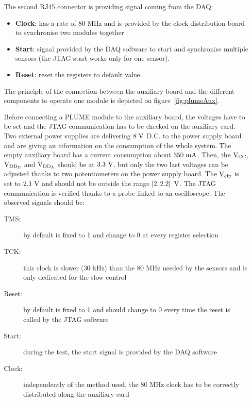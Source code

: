   The second RJ45 connector is providing signal coming from the \gls{DAQ}:
  \begin{itemize}
    \item \textbf{Clock}: has a rate of 80 MHz and is provided by the clock distribution board to synchronise two modules together
    \item \textbf{Start}: signal provided by the \gls{DAQ} software to start and synchronise multiple sensors (the \gls{JTAG} start works only for one sensor).
    \item \textbf{Reset}: reset the registers to default value. 
  \end{itemize}

  The principle of the connection between the auxiliary board and the different components to operate one module is depicted on figure~\ref{fig:plumeAux}.

  Before connecting a PLUME module to the auxiliary board, the voltages have to be set and the \gls{JTAG} communication has to be checked on the auxiliary card.
  Two external power supplies are delivering $8~\rm{V}$ D.C. to the power supply board and are giving an information on the consumption of the whole system.
  The empty auxiliary board has a current consumption about $350~\rm{mA}$.
  Then, the $\rm{V}_{\rm{CC}}$, $\rm{V}_{\rm{DD_D}}$ and $\rm{V}_{\rm{DD_A}}$ should be at $3.3~\rm{V}$, but only the two last voltages can be adjusted thanks to two potentiometers on the power supply board.
  The $\rm{V}_{\rm{clp}}$ is set to $2.1~\rm{V}$ and should not be outside the range $\left[2, 2.2\right]~\rm{V}$.
  The \gls{JTAG} communication is verified thanks to a probe linked to an oscilloscope.
  The observed signals should be:

  \begin{description}
    \item[\gls{TMS}:] by default is fixed to 1 and change to 0 at every register selection
    \item[\gls{TCK}:] this clock is slower (30 kHz) than the 80 MHz needed by the sensors and is only dedicated for the slow control
    \item[Reset:] by default is fixed to 1 and should change to 0 every time the reset is called by the \gls{JTAG} software
    \item[Start:] during the test, the start signal is provided by the \gls{DAQ} software
    \item[Clock:] independently of the method used, the 80 MHz clock has to be correctly distributed along the auxiliary card
  \end{description}

